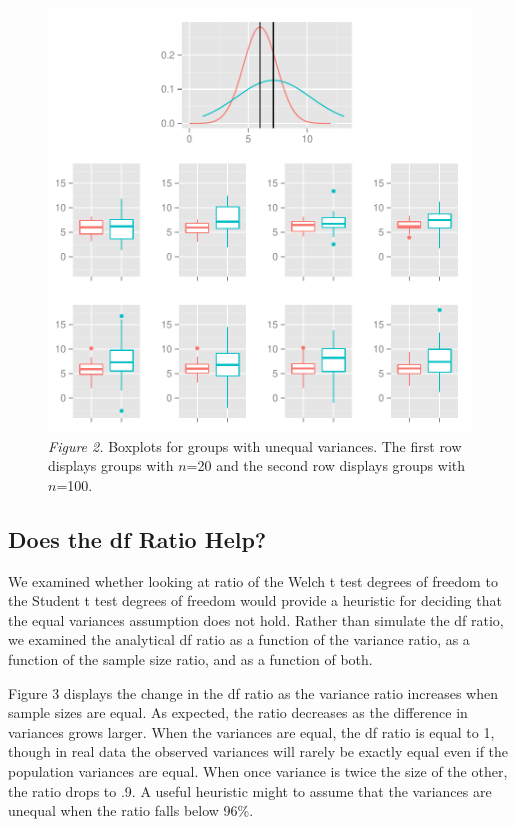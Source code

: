 \documentclass[man,a4paper,noextraspace,apacite]{apa6}
\begin{document}
\begin{figure}
\includegraphics{WelchManuscript-MASTER-varDifferentBoxplots}
\textit{Figure 2.} Boxplots for groups with unequal variances. The first row displays groups with $n$=20 and the second row displays groups with $n$=100.
\end{figure}


\subsection{Does the df Ratio Help?}
    We examined whether looking at ratio of the Welch t test degrees of freedom to the Student t test degrees of freedom would provide a heuristic for deciding that the equal variances assumption does not hold. Rather than simulate the df ratio, we examined the analytical df ratio as a function of the variance ratio, as a function of the sample size ratio, and as a function of both. 

    Figure 3 displays the change in the df ratio as the variance ratio increases when sample sizes are equal. As expected, the ratio decreases as the difference in variances grows larger. When the variances are equal, the df ratio is equal to 1, though in real data the observed variances will rarely be exactly equal even if the population variances are equal. When once variance is twice the size of the other, the ratio drops to .9. A useful heuristic might to assume that the variances are unequal when the ratio falls below 96\%.
  
\end{document}
